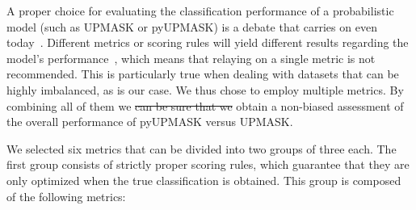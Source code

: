 \documentclass[draft]{aa}
\providecommand{\DIFaddtex}[1]{{\protect\color{blue}\uwave{#1}}} %
\providecommand{\DIFdeltex}[1]{{\protect\color{red}\sout{#1}}}                      %
\providecommand{\DIFaddbegin}{} %
\providecommand{\DIFaddend}{} %
\providecommand{\DIFdelbegin}{} %
\providecommand{\DIFdelend}{} %
\providecommand{\DIFadd}[1]{\texorpdfstring{\DIFaddtex{#1}}{#1}} %
\providecommand{\DIFdel}[1]{\texorpdfstring{\DIFdeltex{#1}}{}} %
\newcommand{\DIFscaledelfig}{0.5}
\newlength{\DIFdelgraphicswidth} %
\newlength{\DIFdelgraphicsheight} %
\newcommand{\DIFaddincludegraphics}[2][]{{\color{blue}\fbox{\DIFOincludegraphics[#1]{#2}}}} %
\newcommand{\DIFdelincludegraphics}[2][]{%
\sbox{\DIFdelgraphicsbox}{\DIFOincludegraphics[#1]{#2}}%
\settoboxwidth{\DIFdelgraphicswidth}{\DIFdelgraphicsbox} %
\settoboxtotalheight{\DIFdelgraphicsheight}{\DIFdelgraphicsbox} %
\scalebox{\DIFscaledelfig}{%
\parbox[b]{\DIFdelgraphicswidth}{\usebox{\DIFdelgraphicsbox}\\[-\baselineskip] \rule{\DIFdelgraphicswidth}{0em}}\llap{\resizebox{\DIFdelgraphicswidth}{\DIFdelgraphicsheight}{%
\setlength{\unitlength}{\DIFdelgraphicswidth}%
\begin{picture}(1,1)%
\thicklines\linethickness{2pt} %
{\color[rgb]{1,0,0}\put(0,0){\framebox(1,1){}}}%
{\color[rgb]{1,0,0}\put(0,0){\line( 1,1){1}}}%
{\color[rgb]{1,0,0}\put(0,1){\line(1,-1){1}}}%
\end{picture}%
}\hspace*{3pt}}} %
} %
\DeclareRobustCommand{\DIFaddbegin}{\DIFOaddbegin \let\includegraphics\DIFaddincludegraphics} %
\DeclareRobustCommand{\DIFaddend}{\DIFOaddend \let\includegraphics\DIFOincludegraphics} %
\DeclareRobustCommand{\DIFdelbegin}{\DIFOdelbegin \let\includegraphics\DIFdelincludegraphics} %
\DeclareRobustCommand{\DIFdelend}{\DIFOaddend \let\includegraphics\DIFOincludegraphics} %
\begin{document}
 A proper choice for evaluating the classification performance of a
 probabilistic model (such as UPMASK or pyUPMASK) is a debate that carries on
 even today~\citep{Hand_2009,hernandez_2012}. Different metrics or scoring
 rules will yield different results regarding the model's
 performance~\citep{Merkle_2013}, which means that relaying on a single metric
 is not recommended. This is particularly true when dealing with datasets that
 can be highly imbalanced, as is our case. We thus chose to employ multiple
 metrics. By combining all of them we \DIFdelbegin \DIFdel{can be sure that we }\DIFdelend \DIFaddbegin \DIFadd{expect to }\DIFaddend obtain a non-biased
 assessment of the overall performance of pyUPMASK versus UPMASK.

 We selected six metrics that can be divided into two groups of three each.
 The first group consists of strictly proper scoring rules, which
 guarantee that they are only optimized when the true classification is
 obtained. This group is composed of the following metrics:\\

\end{document}
